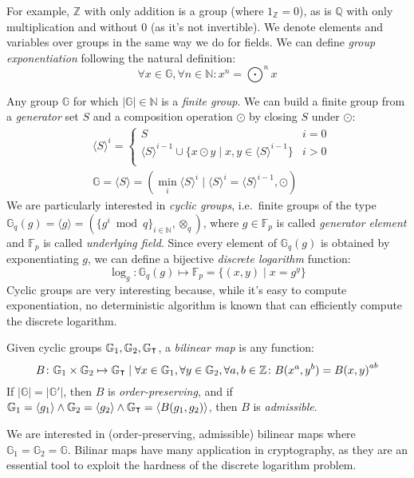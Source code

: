 \noindent For example, \(\mathbb{Z}\) with only addition is a group (where \(1_{\mathbb{Z}} = 0\)),
as is \(\mathbb{Q}\) with only multiplication and without \(0\) (as it's not invertible).
We denote elements and variables over groups in the same way we do for fields.
We can define \emph{group exponentiation} following the natural definition:
\[\forall x \in \mathbb{G}, \forall n \in \mathbb{N}\colon x^n = \bigodot^{n}{x}\]

Any group \(\mathbb{G}\) for which \(|\mathbb{G}| \in \mathbb{N}\) is a \emph{finite group}.
We can build a finite group from a \emph{generator} set \(S\) and a composition operation
\(\odot \) by closing \(S\) under \(\odot \):
\begin{align*}
	 & {\langle{S}\rangle}^i =
	\begin{cases}
		S                                                                                   & i = 0
		\\
		{\langle{S}\rangle}^{i-1} \cup \{x \odot y \mid x,y \in {\langle{S}\rangle}^{i-1}\} & i > 0
		\\
	\end{cases}
	\\
	 & \mathbb{G} = \langle{S}\rangle =
	(\min_{i}{{\langle{S}\rangle}^{i}} \mid {\langle{S}\rangle}^{i} = {\langle{S}\rangle}^{i-1}, \odot)
\end{align*}
We are particularly interested in \emph{cyclic groups}, i.e.\ finite groups of the type
\(\mathbb{G}_q(g) = \langle{g}\rangle = ({\{g^i \bmod q\}}_{i \in \mathbb{N}},
\otimes_q)\), where \(g \in \mathbb{F}_p\) is called \emph{generator element} and
\(\mathbb{F}_p\) is called \emph{underlying field}.
Since every element of \(\mathbb{G}_q(g)\) is obtained by exponentiating \(g\), we can define a
bijective \emph{discrete logarithm} function:
\[\log_g\colon \mathbb{G}_q(g) \mapsto \mathbb{F}_p = \{(x, y) \mid x = g^y\} \]
Cyclic groups are very interesting because, while it's easy to compute exponentiation, no
deterministic algorithm is known that can efficiently compute the discrete logarithm.
\begin{definition}
	Given cyclic groups \(\mathbb{G}_1, \mathbb{G}_2, \mathbb{G}_{\transpose}\), a
	\emph{bilinear map} is any function:
	\[B\colon \mathbb{G}_1 \times \mathbb{G}_2 \mapsto \mathbb{G}_{\transpose} \mid
		\forall x \in \mathbb{G}_1, \forall y \in \mathbb{G}_2, \forall a,b \in \mathbb{Z}\colon
		B(x^a, y^b) = {B(x, y)}^{ab}\]
	If \(|\mathbb{G}| = |\mathbb{G}'|\), then \(B\) is \emph{order-preserving}, and if
	\(\mathbb{G}_1 = \langle{g_1}\rangle \land \mathbb{G}_2 = \langle{g_2}\rangle \land
	\mathbb{G}_{\transpose} = \langle{B(g_1, g_2)}\rangle \), then \(B\) is \emph{admissible}.
\end{definition}

\noindent We are interested in (order-preserving, admissible) bilinear maps where
\(\mathbb{G}_1 = \mathbb{G}_2 = \mathbb{G}\).
Bilinar maps have many application in cryptography, as they are an essential tool to exploit the 
hardness of the discrete logarithm problem.
